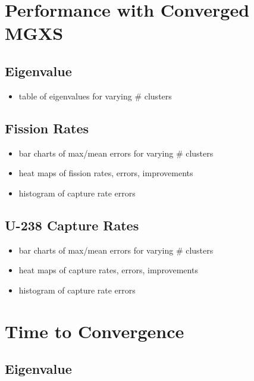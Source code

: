 \section{Performance with Converged MGXS}
\label{sec:chap7-improvements}

\subsection{Eigenvalue}

\begin{itemize}[noitemsep]
  \item table of eigenvalues for varying \# clusters
\end{itemize}

\subsection{Fission Rates}

\begin{itemize}[noitemsep]
  \item bar charts of max/mean errors for varying \# clusters
  \item heat maps of fission rates, errors, improvements
  \item histogram of capture rate errors
\end{itemize}

\subsection{U-238 Capture Rates}

\begin{itemize}[noitemsep]
  \item bar charts of max/mean errors for varying \# clusters
  \item heat maps of capture rates, errors, improvements
  \item histogram of capture rate errors
\end{itemize}


\section{Time to Convergence}

\subsection{Eigenvalue}

